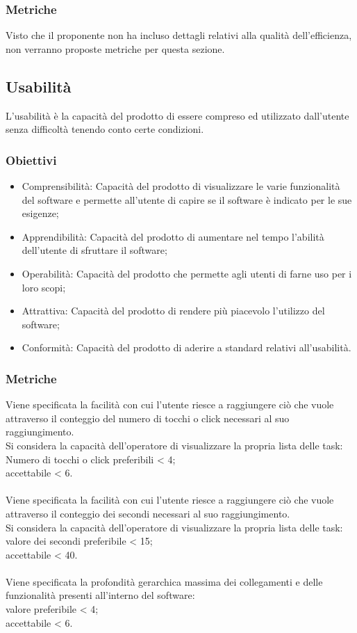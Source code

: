 \subsubsection{Metriche}
Visto che il proponente non ha incluso dettagli relativi alla qualità dell'efficienza, non verranno proposte metriche per questa sezione.

\subsection{Usabilità}
L'usabilità è la capacità del prodotto di essere compreso ed utilizzato dall'utente senza difficoltà tenendo conto certe condizioni.

\subsubsection{Obiettivi}
\begin{itemize}
	\item Comprensibilità: Capacità del prodotto di visualizzare le varie funzionalità del software e permette all'utente di capire se il software è indicato per le sue esigenze;
	\item Apprendibilità: Capacità del prodotto di aumentare nel tempo l'abilità dell'utente di sfruttare il software;
	\item Operabilità: Capacità del prodotto che permette agli utenti di farne uso per i loro scopi;
	\item Attrattiva: Capacità del prodotto di rendere più piacevolo l'utilizzo del software;
	\item Conformità: Capacità del prodotto di aderire a standard relativi all'usabilità.
\end{itemize}

\subsubsection{Metriche}
Viene specificata la facilità con cui l'utente riesce a raggiungere ciò che vuole attraverso il conteggio del numero di tocchi o click necessari al suo raggiungimento.\\
Si considera la capacità dell'operatore di visualizzare la propria lista delle task:\\
Numero di tocchi o click preferibili < 4;\\
accettabile < 6. \\ \space \\
Viene specificata la facilità con cui l'utente riesce a raggiungere ciò che vuole attraverso il conteggio dei secondi necessari al suo raggiungimento.\\
Si considera la capacità dell'operatore di visualizzare la propria lista delle task:\\
valore dei secondi preferibile < 15;\\
accettabile < 40. \\ \space \\
Viene specificata la profondità gerarchica massima dei collegamenti e delle funzionalità presenti all'interno del software:\\
valore preferibile < 4;\\
accettabile < 6.

